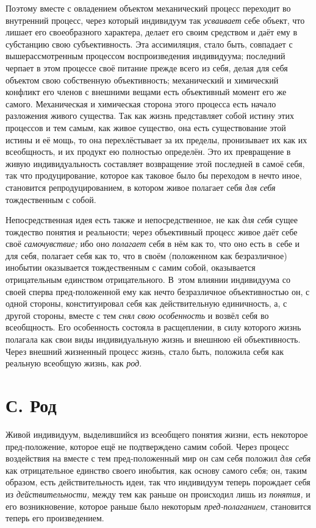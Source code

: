 Поэтому вместе с овладением объектом механический процесс
переходит во внутренний процесс, через который индивидуум так
{\em усваивает} себе
объект, что лишает его своеобразного характера, делает его своим средством
и даёт ему в субстанцию свою субъективность. Эта ассимиляция, стало быть,
совпадает с вышерассмотренным процессом воспроизведения индивидуума;
последний черпает в этом процессе своё питание прежде всего из себя,
делая для себя объектом свою собственную объективность;
механический и химический конфликт его членов с внешними вещами есть
объективный момент его же самого. Механическая и химическая сторона этого
процесса есть начало разложения живого существа. Так как жизнь представляет
собой истину этих процессов и тем самым, как живое существо, она есть
существование этой истины и её мощь, то она перехлёстывает за их пределы,
пронизывает их как их всеобщность, и их продукт ею полностью определён. Это
их превращение в живую индивидуальность составляет возвращение этой
последней в самоё себя, так что продуцирование, которое как таковое было бы
переходом в нечто иное, становится репродуцированием, в котором живое
полагает себя {\em для себя}
тождественным с собой.

Непосредственная идея есть также и непосредственное, не как
{\em для себя} сущее
тождество понятия и реальности; через объективный процесс живое даёт себе
своё {\em самочувствие;} ибо оно {\em полагает}
себя в нём как то, что оно есть в~себе и для себя, полагает
себя как то, что в своём (положенном как безразличное) инобытии оказывается
тождественным с самим собой, оказывается отрицательным единством
отрицательного. В~этом влиянии индивидуума со своей сперва пред-положенной
ему как нечто безразличное объективностью он, с одной стороны,
конституировал себя как действительную единичность, а, с другой стороны,
вместе с тем {\em снял свою
особенность} и возвёл себя во всеобщность. Его особенность
состояла в расщеплении, в силу которого жизнь полагала как свои виды
индивидуальную жизнь и внешнюю ей объективность. Через внешний жизненный
процесс жизнь, стало быть, положила себя как реальную всеобщую жизнь, как
{\em род}.

\section[С. Род]{С. Род}

Живой индивидуум, выделившийся из всеобщего понятия жизни,
есть некоторое пред-положение, которое ещё не подтверждено самим собой.
Через процесс воздействия на вместе с тем пред-положенный мир он сам себя
положил {\em для себя}
как отрицательное единство своего инобытия, как основу самого
себя; он, таким образом, есть действительность идеи, так что индивидуум
теперь порождает себя из
{\em действительности,}
между тем как раньше он происходил лишь из
{\em понятия,} и его
возникновение, которое раньше было некоторым
{\em пред-полаганием,}
становится теперь его произведением.

